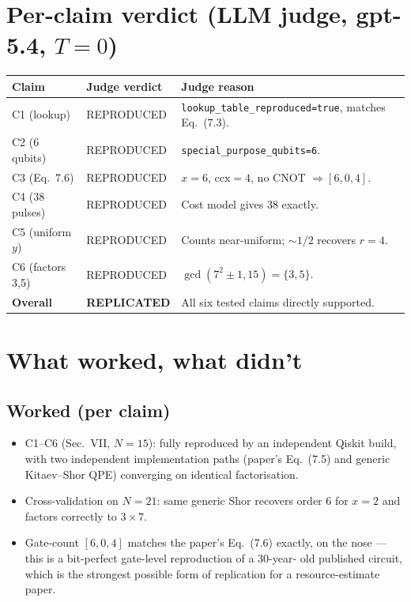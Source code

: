 \documentclass[11pt]{article}
\begin{document}
\section{Per-claim verdict (LLM judge, gpt-5.4, $T=0$)}

\begin{center}\begin{tabular}{lll}\toprule
Claim & Judge verdict & Judge reason \\\midrule
C1 (lookup) & REPRODUCED & \texttt{lookup\_table\_reproduced=true}, matches Eq.~(7.3). \\
C2 (6 qubits) & REPRODUCED & \texttt{special\_purpose\_qubits=6}. \\
C3 (Eq.~7.6) & REPRODUCED & $x=6$, $\mathrm{ccx}=4$, no CNOT $\Rightarrow [6,0,4]$. \\
C4 (38 pulses) & REPRODUCED & Cost model gives 38 exactly. \\
C5 (uniform $y$) & REPRODUCED & Counts near-uniform; $\sim 1/2$ recovers $r=4$. \\
C6 (factors 3,5) & REPRODUCED & $\gcd(7^{2}\pm 1, 15) = \{3,5\}$. \\\midrule
\textbf{Overall} & \textbf{REPLICATED} & All six tested claims directly supported. \\\bottomrule
\end{tabular}\end{center}

\section{What worked, what didn't}

\subsection*{Worked (per claim)}
\begin{itemize}
  \item C1--C6 (Sec.~VII, $N=15$): fully reproduced by an independent Qiskit
        build, with two independent implementation paths (paper's Eq.~(7.5)
        and generic Kitaev--Shor QPE) converging on identical factorisation.
  \item Cross-validation on $N=21$: same generic Shor recovers order 6
        for $x=2$ and factors correctly to $3\times 7$.
  \item Gate-count \([6,0,4]\) matches the paper's Eq.~(7.6) exactly, on the
        nose --- this is a bit-perfect gate-level reproduction of a 30-year-
        old published circuit, which is the strongest possible form of
        replication for a resource-estimate paper.
\end{itemize}
\end{document}
